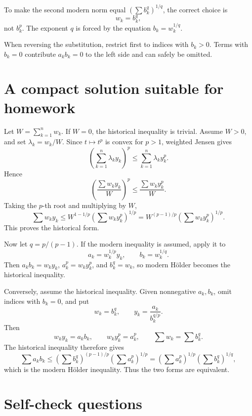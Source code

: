 \documentclass[11pt]{article}
\begin{document}
\begin{warningBox}[Mistake 4: using \(w_k=b_k^p\) in the reverse direction]
To make the second modern norm equal \((\sum b_k^q)^{1/q}\), the correct choice is
\[
 w_k=b_k^q,
\]
not \(b_k^p\). The exponent \(q\) is forced by the equation \(b_k=w_k^{1/q}\).
\end{warningBox}

\begin{warningBox}[Mistake 5: dividing by \(b_k\) when \(b_k=0\)]
When reversing the substitution, restrict first to indices with \(b_k>0\). Terms with \(b_k=0\) contribute \(a_kb_k=0\) to the left side and can safely be omitted.
\end{warningBox}

\section{A compact solution suitable for homework}

\begin{solutionBox}
Let \(W=\sum_{k=1}^{n}w_k\). If \(W=0\), the historical inequality is trivial. Assume \(W>0\), and set \(\lambda_k=w_k/W\). Since \(t\mapsto t^p\) is convex for \(p>1\), weighted Jensen gives
\[
 \left(\sum_{k=1}^{n}\lambda_ky_k\right)^p
 \leq
 \sum_{k=1}^{n}\lambda_ky_k^p.
\]
Hence
\[
 \left(\frac{\sum w_ky_k}{W}\right)^p
 \leq
 \frac{\sum w_ky_k^p}{W}.
\]
Taking the \(p\)-th root and multiplying by \(W\),
\[
 \sum w_ky_k
 \leq
 W^{1-1/p}\left(\sum w_ky_k^p\right)^{1/p}
 =W^{(p-1)/p}\left(\sum w_ky_k^p\right)^{1/p}.
\]
This proves the historical form.

Now let \(q=p/(p-1)\). If the modern inequality is assumed, apply it to
\[
 a_k=w_k^{1/p}y_k,
 \qquad
 b_k=w_k^{1/q}.
\]
Then \(a_kb_k=w_ky_k\), \(a_k^p=w_ky_k^p\), and \(b_k^q=w_k\), so modern H\"older becomes the historical inequality.

Conversely, assume the historical inequality. Given nonnegative \(a_k,b_k\), omit indices with \(b_k=0\), and put
\[
 w_k=b_k^q,
 \qquad
 y_k=\frac{a_k}{b_k^{q/p}}.
\]
Then
\[
 w_ky_k=a_kb_k,
 \qquad
 w_ky_k^p=a_k^p,
 \qquad
 \sum w_k=\sum b_k^q.
\]
The historical inequality therefore gives
\[
 \sum a_kb_k
 \leq
 \left(\sum b_k^q\right)^{(p-1)/p}
 \left(\sum a_k^p\right)^{1/p}
 =
 \left(\sum a_k^p\right)^{1/p}
 \left(\sum b_k^q\right)^{1/q},
\]
which is the modern H\"older inequality. Thus the two forms are equivalent.
\end{solutionBox}

\section{Self-check questions}
\end{document}
